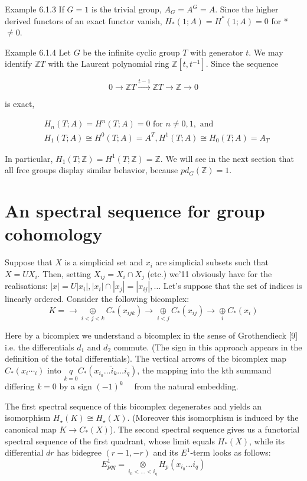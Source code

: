 Example 6.1.3 If $G=1$ is the trivial group, $A_G=A^G=A$. Since the higher derived functors of an exact functor vanish, $H_*(1 ; A)=H^*(1 ; A)=0$ for * $\neq 0$.

Example 6.1.4 Let $G$ be the infinite cyclic group $T$ with generator $t$. We may identify $\mathbb{Z} T$ with the Laurent polynomial ring $\mathbb{Z}\left[t, t^{-1}\right]$. Since the sequence

$$
0 \rightarrow \mathbb{Z} T \xrightarrow{t-1} \mathbb{Z} T \rightarrow \mathbb{Z} \rightarrow 0
$$

is exact,

$$
\begin{aligned}
& H_n(T ; A)=H^n(T ; A)=0 \text { for } n \neq 0,1, \text { and } \\
& H_1(T ; A) \cong H^0(T ; A)=A^T, H^1(T ; A) \cong H_0(T ; A)=A_T
\end{aligned}
$$


In particular, $H_1(T ; \mathbb{Z})=H^1(T ; \mathbb{Z})=\mathbb{Z}$. We will see in the next section that all free groups display similar behavior, because $p d_G(\mathbb{Z})=1$.


\section{An spectral sequence for group cohomology}

Suppose that $X$ is a simplicial set and $x_i$ are simplicial subsets such that $X=U X_i$. Then, setting $X_{i j}=X_i \cap X_j$ (etc.) we'11 obviously have for the realisations: $|x|=U\left|x_i\right|,\left|x_i\right| \cap\left|x_j\right|=\left|x_{i j}\right|, \ldots$ Let's suppose that the set of indices is linearly ordered. Consider the following bicomplex:
$$ K = \longrightarrow \underset{i<j<k}{\oplus} C_*\left(x_{i j k}\right) \longrightarrow \underset{i<j}{\oplus} C_*\left(x_{i j}\right)\longrightarrow \underset{i}{\oplus} C_*\left(x_{i}\right) $$


Here by a bicomplex we understand a bicomplex in the sense of Grothendieck [9] i.e. the differentials $d_1$ and $d_2$ commute. (The sign in this approach appears in the definition of the total differentials). The vertical arrows of the bicomplex map $C_*\left(x_i \cdots_i\right)$ into $\underset{k=0}{q} C_*\left(x_{i_0} \ldots \hat{i}_k \ldots i_q\right)$, the mapping into the kth summand differing $k=0$ by a sign $(-1)^k \quad$ from the natural embedding.

The first spectral sequence of this bicomplex degenerates and yields an isomorphism $H_{\star}(K) \cong H_{\star}(X)$. (Moreover this isomorphism is induced by the canonical map $K \rightarrow C_*(X)$). The second spectral sequence gives us a functorial spectral sequence of the first quadrant, whose limit equals $H_*(X)$, while its differential $d r$ has bidegree $(r-1,-r)$ and its $E^1$-term looks as follows: $$E_{p q q}^1=\underset{i_0<\ldots<i_q}{\otimes} H_p\left(x_{i_0} \ldots i_q\right)$$

